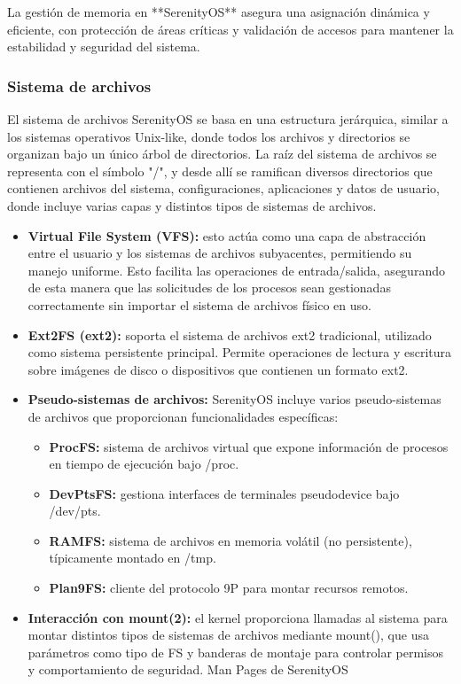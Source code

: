 La gestión de memoria en **SerenityOS** asegura una asignación dinámica y eficiente, con protección de áreas críticas y validación de accesos para mantener la estabilidad y seguridad del sistema.

\subsubsection{Sistema de archivos}

El sistema de archivos SerenityOS se basa en una estructura jerárquica, similar a los sistemas operativos Unix-like, donde todos los archivos y directorios se organizan bajo un único árbol de directorios. La raíz del sistema de archivos se representa con el símbolo "/", y desde allí se ramifican diversos directorios que contienen archivos del sistema, configuraciones, aplicaciones y datos de usuario, donde incluye varias capas y distintos tipos de sistemas de archivos.

\begin{itemize}
    \item \textbf{Virtual File System (VFS):} esto actúa como una capa de abstracción entre el usuario y los sistemas de archivos subyacentes, permitiendo su manejo uniforme. Esto facilita las operaciones de entrada/salida, asegurando de esta manera que las solicitudes de los procesos sean gestionadas correctamente sin importar el sistema de archivos físico en uso.
    \item \textbf{Ext2FS (ext2): } soporta el sistema de archivos ext2 tradicional, utilizado como sistema persistente principal. Permite operaciones de lectura y escritura sobre imágenes de disco o dispositivos que contienen un formato ext2. 
    \item \textbf{Pseudo-sistemas de archivos:} SerenityOS incluye varios pseudo-sistemas de archivos que proporcionan funcionalidades específicas:
    \begin{itemize}
        \item \textbf{ProcFS:} sistema de archivos virtual que expone información de procesos en tiempo de ejecución bajo /proc.

        \item \textbf{DevPtsFS:} gestiona interfaces de terminales pseudodevice bajo /dev/pts. 

        \item \textbf{RAMFS:} sistema de archivos en memoria volátil (no persistente), típicamente montado en /tmp.
        \item \textbf{Plan9FS:} cliente del protocolo 9P para montar recursos remotos.
    \end{itemize}
    \item \textbf{Interacción con mount(2):} el kernel proporciona llamadas al sistema para montar distintos tipos de sistemas de archivos mediante mount(), que usa parámetros como tipo de FS y banderas de montaje para controlar permisos y comportamiento de seguridad. 
Man Pages de SerenityOS
\end{itemize}


